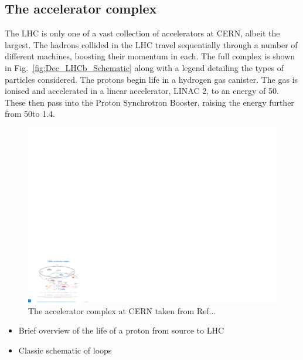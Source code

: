 \subsection{The accelerator complex}

The LHC is only one of a vast collection of accelerators at CERN, albeit the largest. The hadrons collided in the LHC travel sequentially through a number of different machines, boosting their momentum in each. The full complex is shown in Fig.~\ref{fig:Dec_LHCb_Schematic} along with a legend detailing the types of particles considered. The protons begin life in a hydrogen gas canister. The gas is ionised and accelerated in  a linear accelerator, LINAC 2, to an energy of 50\mev. These then pass into the Proton Synchrotron Booster, raising the energy further from 50\mev to 1.4\gev. 
\begin{figure}[!h]
    \centering
    \includegraphics[width=1.0\textwidth]{figs/Detector/Acc_complex.pdf}
    \caption{The accelerator complex at CERN taken from Ref...}
    \label{fig:Dec_Acc_Complex}   
\end{figure}



{\color{Red}
\begin{itemize}
\item Brief overview of the life of a proton from source to LHC
\end{itemize}
}
{\color{Green}
\begin{itemize}
\item Classic schematic of loops
\end{itemize}
}



